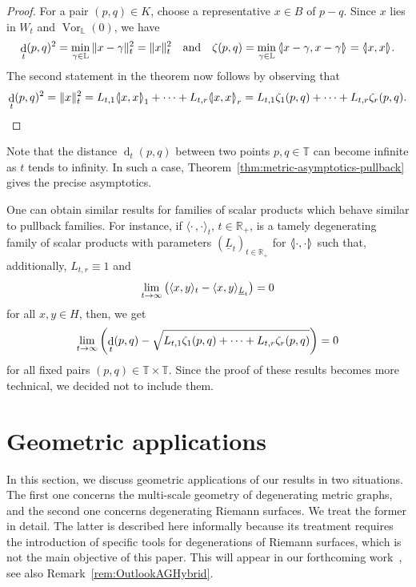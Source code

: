 \documentclass[AHL,Unicode,longabstracts]{cedram}
\newcommand{\innone}[2]{{\langle#2\rangle_{#1}}}
\newcommand{\llangle}{\mathopen{\langle\mkern -3.1mu\lvert}}
\newcommand{\rrangle}{\mathclose{\rvert\mkern -3.1mu\rangle}}
\newcommand{\highinn}[2]{{\llangle#2\rrangle_{#1}}}
\newcommand{\norm}[1]{\|#1\|}
\DeclareMathOperator{\Vor}{Vor}
\DeclareMathOperator{\dist}{d}
\newcommand{\R}{\mathbb{R}}
\newcommand{\T}{\mathbb{T}}
\renewcommand{\L}{\mathbb{L}}
\newcommand{\dtor}{\zeta}
\renewcommand*{\to}{\mathchoice{\longrightarrow}{\rightarrow}{\rightarrow}{\rightarrow}}
\begin{document}
\begin{proof}
For a pair $(p,q) \in K$, choose a representative $x \in B$ of $p-q$. Since $x$ lies in $W_t$ and $ \Vor_\L(0)$, we have
\[
\dist_t(p,q)^2 = \min_{\gamma \in \L} \norm{x-\gamma}_t^2 = \norm{x}_t^2 \quad \text{and} \quad \zeta(p,q) = \min_{\gamma \in \L} \highinn{}{x-\gamma,x-\gamma} = \highinn{}{x,x}.
\]
The second statement in the theorem now follows by observing that
\[
\dist_t(p,q)^2 = \norm{x}_t^2 = L_{t,1} \highinn{1}{x,x} + \dots + L_{t,r}\highinn{r}{x,x} = L_{t,1} \zeta_1(p,q)+ \dots + L_{t,r}\zeta_r(p,q). \qedhere
\]
\end{proof}

\begin{rema}
Note that the distance $\dist_t(p,q)$ between two points $p,q \in \T$ can become infinite as $t$ tends to infinity. In such a case, Theorem~\ref{thm:metric-asymptotics-pullback} gives the precise asymptotics.%
\end{rema}

\begin{rema}
One can obtain similar results for families of scalar products which behave similar to pullback families. For instance, if $\innone{t}{\cdot \,, \cdot}$, $t \in \R_+$, is a tamely degenerating family of scalar products with parameters $(\underline L_t)_{t \in \R_+}$ for $\highinn{}{\cdot, \cdot}$ such that, additionally, $L_{t, r} \equiv 1$ and
\[
\lim_{t \to \infty} \left(\innone{t}{x,y} - \innone{\underline L_t}{x,y}\right) = 0
\]
for all $x,y \in H$, then, we get
\[
\lim_{t \to \infty} \left(\dist_t(p,q) - \sqrt{L_{t,1} \dtor_1(p,q) + \dots + L_{t,r} \dtor_r(p,q)}\right) = 0
\]
for all fixed pairs $(p,q) \in \T \times \T$. Since the proof of these results becomes more technical, we decided not to include them.%
\end{rema}



\section{Geometric applications} \label{sec:tropical_curves}
In this section, we discuss geometric applications of our results in two situations. The first one concerns the multi-scale geometry of degenerating metric graphs, and the second one concerns degenerating Riemann surfaces. We treat the former in detail. The latter is described here informally because its treatment requires the introduction of specific tools for degenerations of Riemann surfaces, which is not the main objective of this paper. This will appear in our forthcoming work~\cite{AN-AG-hybrid}, see also Remark~\ref{rem:OutlookAGHybrid}.
\end{document}

